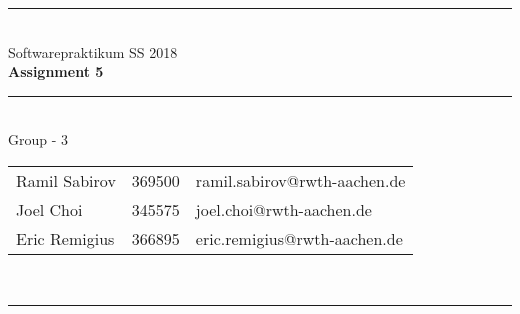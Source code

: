 \documentclass[a4paper,12pt]{article}
\begin{document}
\begin{center}
	\rule{\textwidth}{0.1pt}\\[1cm]
	
	\Large Softwarepraktikum SS 2018\\\bf Assignment 5 %
\end{center}


\begin{center}

	\rule{\textwidth}{0.1pt}\\[0.5cm]

	{\Large Group - 3\\[5mm]} %

	\begin{tabular}{lll}
		Ramil Sabirov & 369500 & ramil.sabirov@rwth-aachen.de\\

		Joel Choi & 345575 & joel.choi@rwth-aachen.de \\

		Eric Remigius & 366895 & eric.remigius@rwth-aachen.de \\

	\end{tabular}\\[0.5cm]

	\rule{\textwidth}{0.1pt}\\[1cm]

\end{center}





\end{document}
